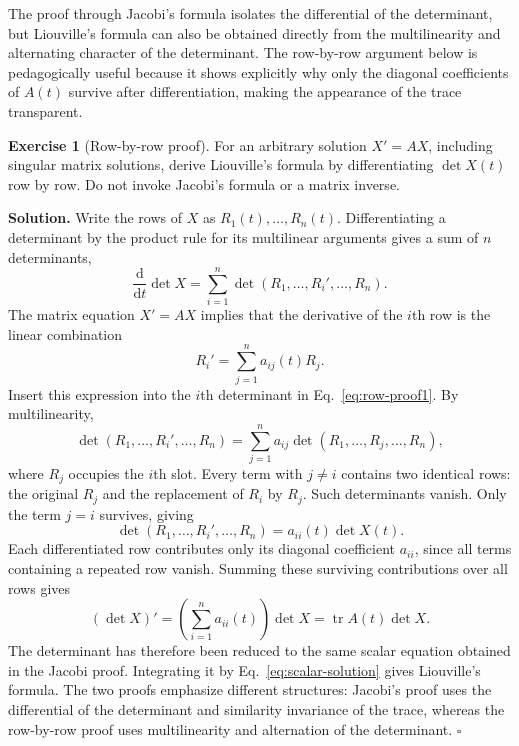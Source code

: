 \documentclass[11pt,a4paper]{article}
\newcommand{\be}{\begin{equation}}
\newcommand{\ee}{\end{equation}}
\newcommand{\lb}[1]{\label{#1}}
\newcommand{\dd}{\mathrm{d}}
\DeclareMathOperator{\tr}{tr}
\theoremstyle{definition}
\newtheorem{exercise}{Exercise}[section]
\newenvironment{solution}
{\par\noindent\textbf{Solution.}}
{\hfill$\square$\par}
\numberwithin{equation}{section}
\begin{document}
The proof through Jacobi's formula isolates the differential of the determinant, but Liouville's formula can also be obtained directly from the multilinearity and alternating character of the determinant. The row-by-row argument below is pedagogically useful because it shows explicitly why only the diagonal coefficients of $A(t)$ survive after differentiation, making the appearance of the trace transparent.

\begin{exercise}[Row-by-row proof]
For an arbitrary solution $X'=AX$, including singular matrix solutions, derive Liouville's formula by differentiating $\det X(t)$ row by row. Do not invoke Jacobi's formula or a matrix inverse.
\end{exercise}

\begin{solution}
Write the rows of $X$ as $R_1(t),\ldots,R_n(t)$. Differentiating a determinant by the product rule for its multilinear arguments gives a sum of $n$ determinants,
\be
\frac{\dd}{\dd t}\det X
=
\sum_{i=1}^{n}
\det(R_1,\ldots,R_i',\ldots,R_n).
\lb{eq:row-proof1}
\ee
The matrix equation $X'=AX$ implies that the derivative of the $i$th row is the linear combination
\be
R_i'
=
\sum_{j=1}^{n}a_{ij}(t)R_j.
\lb{eq:row-proof2}
\ee
Insert this expression into the $i$th determinant in Eq.~\eqref{eq:row-proof1}. By multilinearity,
\be
\det(R_1,\ldots,R_i',\ldots,R_n)
=
\sum_{j=1}^{n}
a_{ij}
\det(R_1,\ldots,R_j,\ldots,R_n),
\lb{eq:row-proof3}
\ee
where $R_j$ occupies the $i$th slot. Every term with $j\neq i$ contains two identical rows: the original $R_j$ and the replacement of $R_i$ by $R_j$. Such determinants vanish. Only the term $j=i$ survives, giving
\be
\det(R_1,\ldots,R_i',\ldots,R_n)
=
a_{ii}(t)\det X(t).
\lb{eq:row-proof4}
\ee
Each differentiated row contributes only its diagonal coefficient $a_{ii}$, since all terms containing a repeated row vanish. Summing these surviving contributions over all rows gives
\be
(\det X)'
=
\left(
\sum_{i=1}^{n}a_{ii}(t)
\right)
\det X
=
\tr A(t)\det X.
\lb{eq:row-proof5}
\ee
The determinant has therefore been reduced to the same scalar equation obtained in the Jacobi proof. Integrating it by Eq.~\eqref{eq:scalar-solution} gives Liouville's formula. The two proofs emphasize different structures: Jacobi's proof uses the differential of the determinant and similarity invariance of the trace, whereas the row-by-row proof uses multilinearity and alternation of the determinant.
\end{solution}

\end{document}
